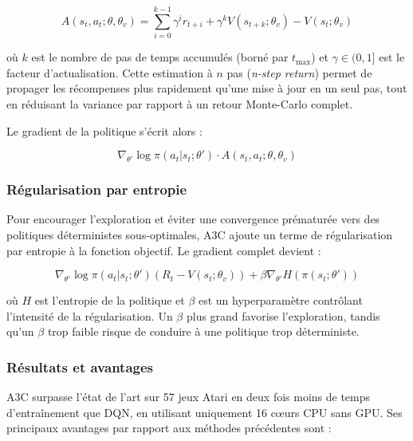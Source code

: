 \begin{equation}
    A(s_t, a_t ; \theta, \theta_v) = \sum_{i=0}^{k-1} \gamma^i r_{t+i} + 
    \gamma^k V(s_{t+k} ; \theta_v) - V(s_t ; \theta_v)
    \label{eq:advantage}
\end{equation}

où $k$ est le nombre de pas de temps accumulés (borné par $t_{\max}$) et 
$\gamma \in (0,1]$ est le facteur d'actualisation. Cette estimation à $n$ pas 
(\textit{n-step return}) permet de propager les récompenses plus rapidement 
qu'une mise à jour en un seul pas, tout en réduisant la variance par rapport 
à un retour Monte-Carlo complet.

Le gradient de la politique s'écrit alors :

\begin{equation}
    \nabla_{\theta'} \log \pi(a_t | s_t ; \theta') \cdot A(s_t, a_t ; 
    \theta, \theta_v)
    \label{eq:policy_gradient}
\end{equation}

\subsubsection*{Régularisation par entropie}

Pour encourager l'exploration et éviter une convergence prématurée vers des 
politiques déterministes sous-optimales, A3C ajoute un terme de régularisation 
par entropie à la fonction objectif. Le gradient complet devient :

\begin{equation}
    \nabla_{\theta'} \log \pi(a_t | s_t ; \theta')(R_t - V(s_t ; \theta_v)) 
    + \beta \nabla_{\theta'} H(\pi(s_t ; \theta'))
    \label{eq:entropy}
\end{equation}

où $H$ est l'entropie de la politique et $\beta$ est un hyperparamètre 
contrôlant l'intensité de la régularisation. Un $\beta$ plus grand favorise 
l'exploration, tandis qu'un $\beta$ trop faible risque de conduire à une 
politique trop déterministe.

\subsubsection*{Résultats et avantages}

A3C surpasse l'état de l'art sur 57 jeux Atari en deux fois moins de temps 
d'entraînement que DQN, en utilisant uniquement 16 cœurs CPU sans GPU. 
Ses principaux avantages par rapport aux méthodes précédentes sont :

